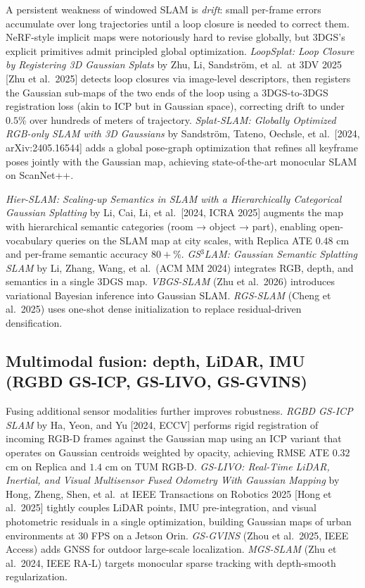 A persistent weakness of windowed SLAM is \emph{drift}: small per-frame errors accumulate over long trajectories until a loop closure is needed to correct them. NeRF-style implicit maps were notoriously hard to revise globally, but 3DGS's explicit primitives admit principled global optimization. \emph{LoopSplat: Loop Closure by Registering 3D Gaussian Splats} by Zhu, Li, Sandström, et al.~at 3DV 2025 {[}Zhu et al.~2025{]} detects loop closures via image-level descriptors, then registers the Gaussian sub-maps of the two ends of the loop using a 3DGS-to-3DGS registration loss (akin to ICP but in Gaussian space), correcting drift to under \(0.5\)\% over hundreds of meters of trajectory. \emph{Splat-SLAM: Globally Optimized RGB-only SLAM with 3D Gaussians} by Sandström, Tateno, Oechsle, et al.~{[}2024, arXiv:2405.16544{]} adds a global pose-graph optimization that refines all keyframe poses jointly with the Gaussian map, achieving state-of-the-art monocular SLAM on ScanNet++.

\emph{Hier-SLAM: Scaling-up Semantics in SLAM with a Hierarchically Categorical Gaussian Splatting} by Li, Cai, Li, et al.~{[}2024, ICRA 2025{]} augments the map with hierarchical semantic categories (room → object → part), enabling open-vocabulary queries on the SLAM map at city scales, with Replica ATE \(0.48\) cm and per-frame semantic accuracy \(80+\)\%. \emph{GS\(^{3}\)LAM: Gaussian Semantic Splatting SLAM} by Li, Zhang, Wang, et al.~(ACM MM 2024) integrates RGB, depth, and semantics in a single 3DGS map. \emph{VBGS-SLAM} (Zhu et al.~2026) introduces variational Bayesian inference into Gaussian SLAM. \emph{RGS-SLAM} (Cheng et al.~2025) uses one-shot dense initialization to replace residual-driven densification.

\subsection{Multimodal fusion: depth, LiDAR, IMU (RGBD GS-ICP, GS-LIVO, GS-GVINS)}\label{multimodal-fusion-depth-lidar-imu-rgbd-gs-icp-gs-livo-gs-gvins}

Fusing additional sensor modalities further improves robustness. \emph{RGBD GS-ICP SLAM} by Ha, Yeon, and Yu {[}2024, ECCV{]} performs rigid registration of incoming RGB-D frames against the Gaussian map using an ICP variant that operates on Gaussian centroids weighted by opacity, achieving RMSE ATE \(0.32\) cm on Replica and \(1.4\) cm on TUM RGB-D. \emph{GS-LIVO: Real-Time LiDAR, Inertial, and Visual Multisensor Fused Odometry With Gaussian Mapping} by Hong, Zheng, Shen, et al.~at IEEE Transactions on Robotics 2025 {[}Hong et al.~2025{]} tightly couples LiDAR points, IMU pre-integration, and visual photometric residuals in a single optimization, building Gaussian maps of urban environments at \(30\) FPS on a Jetson Orin. \emph{GS-GVINS} (Zhou et al.~2025, IEEE Access) adds GNSS for outdoor large-scale localization. \emph{MGS-SLAM} (Zhu et al.~2024, IEEE RA-L) targets monocular sparse tracking with depth-smooth regularization.

